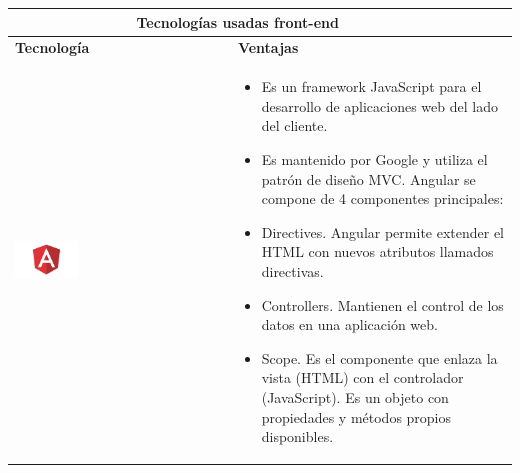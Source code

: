   \newpage
    \begin{table}[b!]
    \centering
    \vspace{33mm}
      \begin{tabular}{|p{2cm}|ll}
        \hline
        \multicolumn{2}{|c|}{{\bf Tecnologías usadas front-end}} \\ 
        \hline
          \multicolumn{1}{|p{4cm}|}{{\bf Tecnología}} & 
      \multicolumn{1}{p{10cm}|}{{\bf Ventajas}}\\
        \hline
          \multicolumn{1}{|p{5cm}|}{\includegraphics[width=0.3\textwidth]{images/angular}} & 
          \multicolumn{2}{p{10cm}|}{\begin{itemize}
          \vspace{-5mm}
          \item Es un framework JavaScript para el desarrollo de aplicaciones web del lado del cliente.
         \item Es mantenido por Google y utiliza el patrón de diseño MVC.
         Angular se compone de 4 componentes principales:
         \item Directives. Angular permite extender el HTML con nuevos
               atributos llamados directivas. 
         \item Controllers. Mantienen el control de los datos en una aplicación web. 
          \item Scope. Es el componente que enlaza la vista (HTML) con el controlador (JavaScript). Es un objeto con propiedades y métodos propios disponibles.
      \end{itemize}} \\
        
        \hline
      \end{tabular}
      \label{table: tecnologias usadas}
    \end{table}

